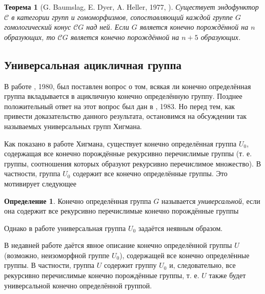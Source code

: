 \documentclass[14pt, dvipsnames, twoside]{extarticle}
\newtheorem{theorem}{Теорема}
\theoremstyle{definition}
\newtheorem{defi}{Определение}
\theoremstyle{remark}
\begin{document}
\begin{theorem}[G. Baumslag, E. Dyer, A. Heller, 1977, \cite{BDH}]\label{functor_C}
Существует эндофунктор $\mathcal{C}$ в категории групп и гомоморфизмов, сопоставляющий каждой группе $G$ гомологический конус $\mathcal{C}G$ над ней. Если $G$ является конечно порождённой на $n$ образующих, то $\mathcal{C}G$ является конечно порождённой на $n + 5$ образующих. 
\end{theorem}

















\subsection{Универсальная ацикличная группа}\label{SectionUnivAcyclGroup}

В работе \cite{BDH}, 1980, был поставлен вопрос о том, всякая ли конечно определённая группа вкладывается в ацикличную конечно определённую группу. Позднее положительный ответ на этот вопрос был дан в \cite{BaumslagUniversal}, 1983. Но перед тем, как привести доказательство данного результата, остановимся на обсуждении так называемых универсальных групп Хигмана.

Как показано в работе \cite{UniversalHigmanGroup} Хигмана, существует конечно определённая группа $U_0$, содержащая все конечно порождённые рекурсивно перечислимые группы (т. е. группы, соотношения которых образуют рекурсивно перечислимое множество). В частности, группа $U_0$ содержит все конечно определённые группы. Это мотивирует следующее

\begin{defi}
Конечно определённая группа $G$ называется {\it универсальной}, если она содержит все рекурсивно перечислимые конечно порождённые группы
\end{defi} 

Однако в работе \cite{UniversalHigmanGroup} универсальная группа $U_0$ задаётся неявным образом. 

В недавней работе \cite{ExplicityPresentation} даётся явное описание конечно определённой группы $U$ (возможно, неизоморфной группе $U_0$), содержащей все конечно определённые группы. В частности, группа $U$ содержит группу $U_0$ и, следовательно, все рекурсивно перечислимые конечно порождённые группы, т. е. $U$ также будет универсальной конечно определённой группой. 
\end{document}

